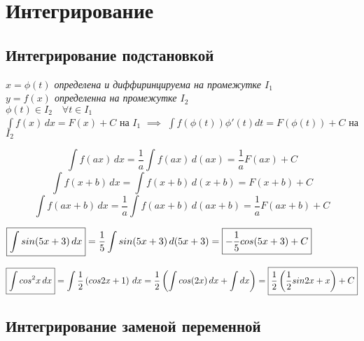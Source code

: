 \section{Интегрирование}

\subsection{Интегрирование подстановкой}

\begin{theorem}
\textit{
  $x = \phi(t)$ определена и диффиринцируема на промежутке $I_1$ \\
  $y = f(x)$ определенна на промежутке $I_2$ \\
  $\phi(t) \in I_2 \quad \forall t \in I_1$
} \\
$\displaystyle\int f(x)\,dx = F(x) + C$ на $I_1$ $\implies$ $\displaystyle\int f(\phi(t))\phi'(t)dt = F(\phi(t)) + C$ на $I_2$
\end{theorem}
\begin{corollary}
$$\int f(ax)\,dx = \frac{1}{a}\int f(ax)\,d(ax) = \frac{1}{a}F(ax) + C$$
$$\int f(x + b)\,dx = \int f(x + b)\,d(x + b) = F(x + b) + C$$
$$\int f(ax + b)\,dx = \frac{1}{a}\int f(ax + b)\,d(ax + b) = \frac{1}{a}F(ax + b) + C$$
\end{corollary}

\begin{eg}
$\fbox{$\displaystyle\int sin(5x + 3)\,dx$} = \displaystyle\frac{1}{5}\int sin(5x + 3)\,d(5x + 3) = \fbox{$-\displaystyle\frac{1}{5}cos(5x + 3) + C$}$
\end{eg}

\begin{eg}
$\fbox{$\displaystyle\int cos^2x\,dx$} = \displaystyle\int \frac{1}{2}\left(cos2x + 1\right)\,dx = \frac{1}{2}\left(\int cos(2x)\,dx + \int dx\right) = \fbox{$\displaystyle\frac{1}{2}\left(\frac{1}{2}sin2x + x\right) + C$}$
\end{eg}

\subsection{Интегрирование заменой переменной}

